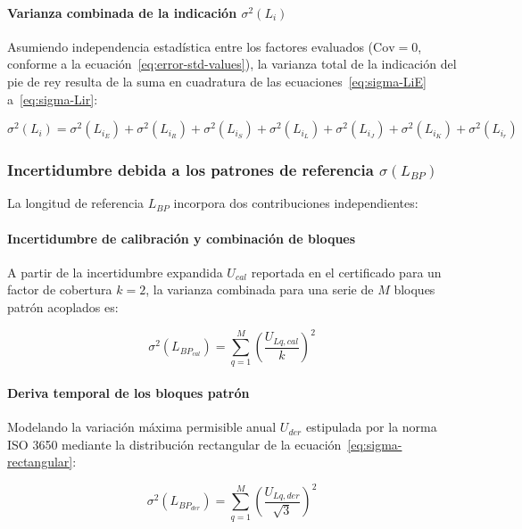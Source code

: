 \paragraph{Varianza combinada de la indicación $\sigma^2(L_i)$}
Asumiendo independencia estadística entre los factores evaluados ($\text{Cov} = 0$, conforme a la ecuación~\eqref{eq:error-std-values}), la varianza total de la indicación del pie de rey resulta de la suma en cuadratura de las ecuaciones~\eqref{eq:sigma-LiE} a~\eqref{eq:sigma-Lir}:

\begin{equation}
    \sigma^2(L_i) = \sigma^2(L_{i_E}) + \sigma^2(L_{i_R}) + \sigma^2(L_{i_S}) + \sigma^2(L_{i_L}) + \sigma^2(L_{i_J}) + \sigma^2(L_{i_K}) + \sigma^2(L_{i_r})
    \label{eq:sigma-Li-total}
\end{equation}

\subsubsection{Incertidumbre debida a los patrones de referencia \texorpdfstring{$\sigma(L_{BP})$}{\sigma(L_{BP})}}

La longitud de referencia $L_{BP}$ incorpora dos contribuciones independientes:

\paragraph{Incertidumbre de calibración y combinación de bloques}
A partir de la incertidumbre expandida $U_{cal}$ reportada en el certificado para un factor de cobertura $k = 2$, la varianza combinada para una serie de $M$ bloques patrón acoplados es:

\begin{equation}
    \sigma^2(L_{BP_{cal}}) = \sum_{q=1}^M \left(\frac{U_{Lq,cal}}{k}\right)^2
    \label{eq:sigma-BP-cal}
\end{equation}

\paragraph{Deriva temporal de los bloques patrón}
Modelando la variación máxima permisible anual $U_{der}$ estipulada por la norma ISO 3650 mediante la distribución rectangular de la ecuación~\eqref{eq:sigma-rectangular}:

\begin{equation}
    \sigma^2(L_{BP_{der}}) = \sum_{q=1}^M \left(\frac{U_{Lq,der}}{\sqrt{3}}\right)^2
    \label{eq:sigma-BP-der}
\end{equation}

